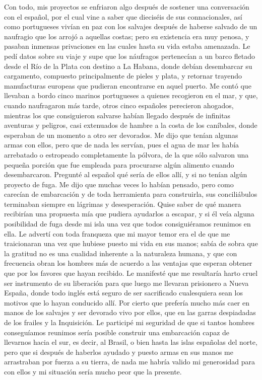 \documentclass{novela}
\begin{document}
    Con todo, mis proyectos se enfriaron algo después de sostener una conversación con el español, por el cual vine a saber que dieciséis de sus connacionales, así como portugueses vivían en paz con los salvajes después de haberse salvado de un naufragio que los arrojó a aquellas costas; pero su existencia era muy penosa, y pasaban inmensas privaciones en las cuales hasta su vida estaba amenazada. Le pedí datos sobre su viaje y supe que los náufragos pertenecían a un barco fletado desde el Río de la Plata con destino a La Habana, donde debían desembarcar su cargamento, compuesto principalmente de pieles y plata, y retornar trayendo manufacturas europeas que pudieran encontrarse en aquel puerto. Me contó que llevaban a bordo cinco marinos portugueses a quienes recogieron en el mar, y que, cuando naufragaron más tarde, otros cinco españoles perecieron ahogados, mientras los que consiguieron salvarse habían llegado después de infinitas aventuras y peligros, casi extenuados de hambre a la costa de los caníbales, donde esperaban de un momento a otro ser devorados.
    Me dijo que tenían algunas armas con ellos, pero que de nada les servían, pues el agua de mar les había arrebatado o estropeado completamente la pólvora, de la que sólo salvaron una pequeña porción que fue empleada para procurarse algún alimento cuando desembarcaron.
    Pregunté al español qué sería de ellos allí, y si no tenían algún proyecto de fuga. Me dijo que muchas veces lo habían pensado, pero como carecían de embarcación y de toda herramienta para construirla, sus conciliábulos terminaban siempre en lágrimas y desesperación.
    Quise saber de qué manera recibirían una propuesta mía que pudiera ayudarlos a escapar, y si él veía alguna posibilidad de fuga desde mi isla una vez que todos consiguiéramos reunimos en ella. Le advertí con toda franqueza que mi mayor temor era el de que me traicionaran una vez que hubiese puesto mi vida en sus manos; sabía de sobra que la gratitud no es una cualidad inherente a la naturaleza humana, y que con frecuencia obran los hombres más de acuerdo a las ventajas que esperan obtener que por los favores que hayan recibido. Le manifesté que me resultaría harto cruel ser instrumento de su liberación para que luego me llevaran prisionero a Nueva España, donde todo inglés está seguro de ser sacrificado cualesquiera sean los motivos que lo hayan conducido allí. Por cierto que prefería mucho más caer en manos de los salvajes y ser devorado vivo por ellos, que en las garras despiadadas de los frailes y la Inquisición. Le participé mi seguridad de que si tantos hombres conseguíamos reunimos sería posible construir una embarcación capaz de llevarnos hacia el sur, es decir, al Brasil, o bien hasta las islas españolas del norte, pero que si después de haberlos ayudado y puesto armas en sus manos me arrastraban por fuerza a su tierra, de nada me habría valido mi generosidad para con ellos y mi situación sería mucho peor que la presente.
\end{document}
